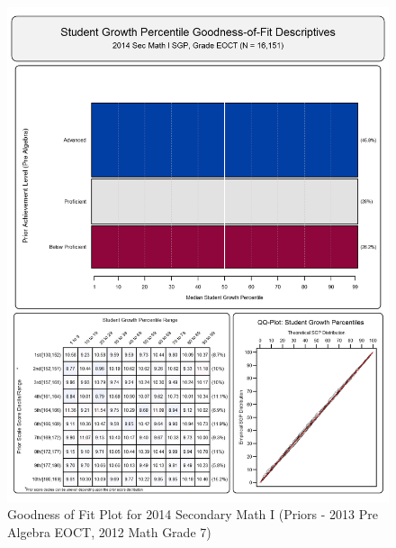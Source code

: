 \documentclass[12pt]{article}
\begin{document}
\begin{figure}[htbp]
\centering
\includegraphics{../img/Goodness_of_Fit/SEC_MATH_I.2014/2014_SEC_MATH_I_EOCT;2013_PRE_ALGEBRA_EOCT;2012_MATH_7.png}
\caption{Goodness of Fit Plot for 2014 Secondary Math I (Priors - 2013
Pre Algebra EOCT, 2012 Math Grade 7)}
\end{figure}
\end{document}
